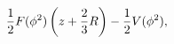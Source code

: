 \begin{equation}
\label{eq:prop2}
{1\over2}F(\phi^2)\left(z+{2\over3}R\right)-{1\over2}V(\phi^2),
\end{equation}

